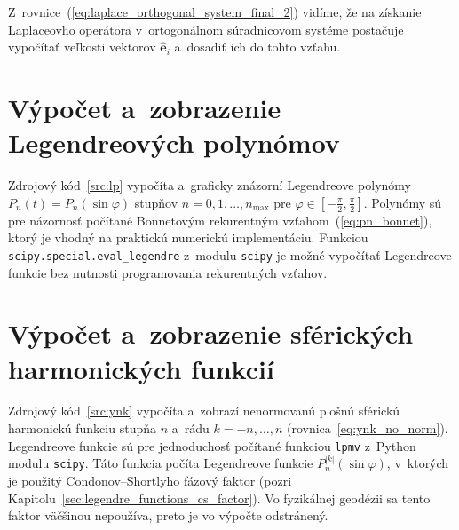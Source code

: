 \documentclass[a4paper,12pt]{book}
\let\vec\mathbf
\begin{document}
Z~rovnice~(\ref{eq:laplace_orthogonal_system_final_2}) vidíme, že na získanie 
Laplaceovho operátora v~ortogonálnom súradnicovom systéme postačuje vypočítať 
veľkosti vektorov $\hat{\vec e}_i$ a~dosadiť ich do tohto vzťahu.




\chapter{Výpočet a~zobrazenie Legendreových polynómov}
\label{app:lp}

Zdrojový kód~\ref{src:lp} vypočíta a~graficky znázorní Legendreove polynómy 
$P_n(t) = P_n(\sin\varphi)$ stupňov $n = 0, 1, \dots, n_{\max}$ pre $\varphi 
\in [-\frac{\pi}{2}, \frac{\pi}{2}]$.  Polynómy sú pre názornosť počítané 
Bonnetovým rekurentným vzťahom~(\ref{eq:pn_bonnet}), ktorý je vhodný na 
praktickú numerickú implementáciu.  Funkciou 
\texttt{scipy.special.eval\_legendre} z~modulu \texttt{scipy} je možné 
vypočítať Legendreove funkcie bez nutnosti programovania rekurentných vzťahov.








\chapter{Výpočet a~zobrazenie sférických harmonických funkcií}
\label{app:sh}

Zdrojový kód~\ref{src:ynk} vypočíta a~zobrazí nenormovanú plošnú sférickú
harmonickú funkciu stupňa $n$ a~rádu $k = -n, \dots, n$
(rovnica~\ref{eq:ynk_no_norm}).  Legendreove funkcie sú pre jednoduchosť
počítané funkciou \texttt{lpmv} z~Python modulu \texttt{scipy}.  Táto funkcia
počíta Legendreove funkcie $P_n^{|k|}(\sin\varphi)$, v~ktorých je
použitý Condonov--Shortlyho fázový faktor (pozri 
Kapitolu~\ref{sec:legendre_functions_cs_factor}).  Vo fyzikálnej geodézii sa 
tento faktor väčšinou nepoužíva, preto je vo výpočte odstránený.



\end{document}
